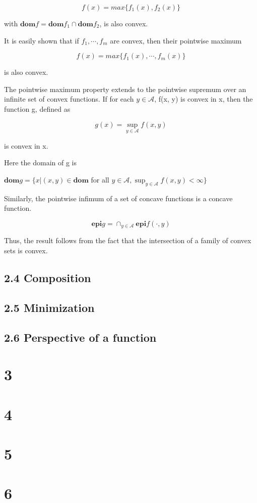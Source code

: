 \documentclass{article}
\begin{document}
\[
    f(x) = max\{f_1(x),f_2(x)\}
\]

with $\mathbf{dom} f=\mathbf{dom}f_1\cap \mathbf{dom}f_2$, is also convex.

It is easily shown that if $f_1,\cdots,f_m$ are convex, then their pointwise maximum

\[
    f(x) = max\{f_1(x),\cdots, f_m(x)\}
\]

is also convex.

The pointwise maximum property extends to the pointwise supremum over an
infinite set of convex functions. If for each $y \in \mathcal{A}$, f(x, y) is convex in x, then the
function g, defined as

\[
g(x)=\sup_{y\in \mathcal{A}} f(x,y)
\]

is convex in x.

Here the domain of g is

\begin{center}
    $\mathbf{dom} g=\{x|(x,y)\in\mathbf{dom}$ for all $y\in\mathcal{A}, \sup_{y\in\mathcal{A}}f(x,y)<\infty\}$
\end{center}

Similarly, the pointwise infimum of a set of concave functions is a concave function.

\[
\mathbf{epi}g=\cap_{y\in\mathcal{A}}\mathbf{epi}f(\cdot,y)    
\]

Thus, the result follows from the fact that the intersection of a family of convex
sets is convex.

\subsection*{2.4 Composition}



\subsection*{2.5 Minimization}


\subsection*{2.6 Perspective of a function}


\section*{3}

\section*{4}

\section*{5}

\section*{6}
\end{document}
